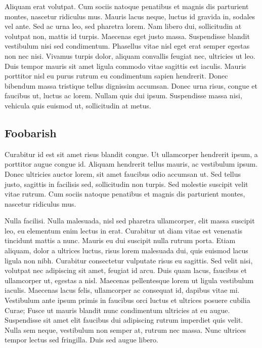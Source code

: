 \documentclass[a4paper, 12pt]{article}
\begin{document}
Aliquam erat volutpat. Cum sociis natoque penatibus et magnis dis parturient montes, nascetur ridiculus mus. Mauris lacus neque, luctus id gravida in, sodales vel ante. Sed ac urna leo, sed pharetra lorem. Nam libero dui, sollicitudin at volutpat non, mattis id turpis. Maecenas eget justo massa. Suspendisse blandit vestibulum nisi sed condimentum. Phasellus vitae nisl eget erat semper egestas non nec nisi. Vivamus turpis dolor, aliquam convallis feugiat nec, ultricies ut leo. Duis tempor mauris sit amet ligula commodo vitae sagittis est iaculis. Mauris porttitor nisl eu purus rutrum eu condimentum sapien hendrerit. Donec bibendum massa tristique tellus dignissim accumsan. Donec urna risus, congue et faucibus ut, luctus ac lorem. Nullam quis dui ipsum. Suspendisse massa nisi, vehicula quis euismod ut, sollicitudin at metus.


\subsection{Foobarish}
\label{section:foo:foobarish}

Curabitur id est sit amet risus blandit congue. Ut ullamcorper hendrerit ipsum, a porttitor augue congue id. Aliquam hendrerit tellus mauris, ac vestibulum ipsum. Donec ultricies auctor lorem, sit amet faucibus odio accumsan ut. Sed tellus justo, sagittis in facilisis sed, sollicitudin non turpis. Sed molestie suscipit velit vitae rutrum. Cum sociis natoque penatibus et magnis dis parturient montes, nascetur ridiculus mus.

Nulla facilisi. Nulla malesuada, nisl sed pharetra ullamcorper, elit massa suscipit leo, eu elementum enim lectus in erat. Curabitur ut diam vitae est venenatis tincidunt mattis a nunc. Mauris eu dui suscipit nulla rutrum porta. Etiam aliquam, dolor a ultrices luctus, risus lorem malesuada dui, quis euismod lacus ligula non nibh. Curabitur consectetur vulputate risus eu sagittis. Sed velit nisi, volutpat nec adipiscing sit amet, feugiat id arcu. Duis quam lacus, faucibus et ullamcorper ut, egestas a nisl. Maecenas pellentesque lorem ut ligula vestibulum iaculis. Maecenas lacus felis, ullamcorper ac consequat id, dapibus vitae mi. Vestibulum ante ipsum primis in faucibus orci luctus et ultrices posuere cubilia Curae; Fusce ut mauris blandit nunc condimentum ultricies at eu augue. Suspendisse sit amet elit faucibus dui adipiscing rutrum imperdiet quis velit. Nulla sem neque, vestibulum non semper at, rutrum nec massa. Nunc ultrices tempor lectus sed fringilla. Duis sed augue libero.
\end{document}
